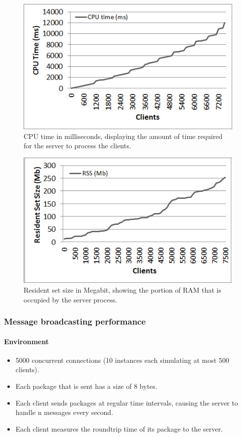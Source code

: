 \documentclass[12pt]{article}
\begin{document}
\begin{center}
\begin{figure}
\label{fig:cpu_time}
\includegraphics[scale=0.75]{test_CLIENT_CPUtime.jpg}
\caption{CPU time in milliseconds, displaying the amount of time required for the server to process the clients.}
\end{figure}


\begin{figure}
\label{fig:cpu_rss}
\includegraphics[scale=0.75]{test_CLIENT_RSS.jpg}
\caption{Resident set size in Megabit, showing the portion of RAM that is occupied by the server process.}
\end{figure}

\end{center}


\subsubsection{Message broadcasting performance}
\paragraph{Environment}
\begin{itemize}
\item 5000 concurrent connections (10 instances each simulating at most 500 clients).
\item Each package that is sent has a size of 8 bytes.
\item Each client sends packages at regular time intervals, causing the server to handle n messages every second.
\item Each client measures the roundtrip time of its package to the server.
\end{itemize}
\end{document}
